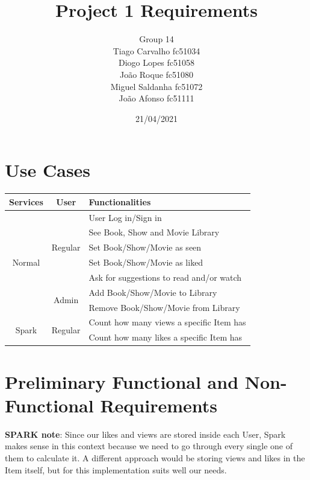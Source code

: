 \documentclass{article}
\title{Project 1 Requirements}
\author{Group 14 \\
Tiago Carvalho fc51034 \\
Diogo Lopes fc51058 \\
João Roque fc51080 \\
Miguel Saldanha fc51072 \\
João Afonso fc51111 \\
}
\date{21/04/2021}
\begin{document}
\maketitle

\section{Use Cases}
  \begin{table}[H]
    \centering
    \begin{tabular}{c|c|l} 
      Services & User & Functionalities \\ \hline
      \multirow{7}{*}{ Normal }
        & \multirow{5}{*}{ Regular } 
          & User Log in/Sign in \\
        & & See Book, Show and Movie Library \\
        & & Set Book/Show/Movie as seen \\
        & & Set Book/Show/Movie as liked \\ 
        & & Ask for suggestions to read and/or watch \\ \cline{2-3}
      & \multirow{2}{*}{ Admin } 
          & Add Book/Show/Movie to Library \\
        & & Remove Book/Show/Movie from Library \\ \hline
      \multirow{2}{*}{ Spark }
        & \multirow{2}{*}{ Regular }
          & Count how many views a specific Item has \\
        & & Count how many likes a specific Item has \\
    \end{tabular}
  \end{table}

\section{Preliminary Functional and Non-Functional Requirements}
\textbf{SPARK note}: Since our likes and views are stored inside each User, Spark makes sense in this context because we need to go through every single one of them to calculate it. A different approach would be storing views and likes in the Item itself, but for this implementation suits well our needs.
  
\end{document}
